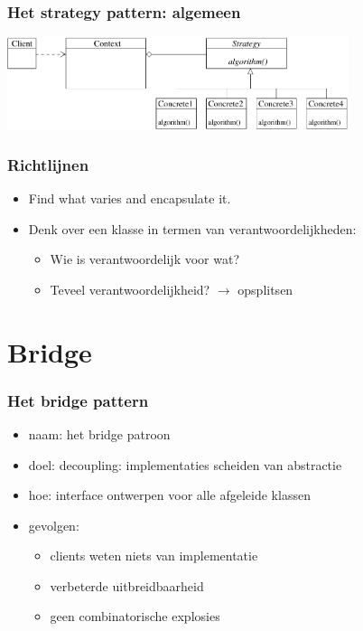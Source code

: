 \documentclass{beamer}
\begin{document}
\begin{frame}
\frametitle{Het strategy pattern: algemeen}
\begin{center}
\includegraphics[width=10cm]{strategy1}
\end{center}
\end{frame}

\begin{frame}
\frametitle{Richtlijnen}
\begin{itemize}
\item Find what varies and encapsulate it.
\item Denk over een klasse in termen van verantwoordelijkheden:
  \begin{itemize}
  \item Wie is verantwoordelijk voor wat?
  \item Teveel verantwoordelijkheid? $\rightarrow$ opsplitsen 
  \end{itemize}
\end{itemize}
\end{frame}

\section{Bridge}
\begin{frame} \frametitle{Het bridge pattern}
  \begin{itemize}
  \item naam: het bridge patroon
  \item doel: decoupling: implementaties scheiden van abstractie
  \item hoe: interface ontwerpen voor alle afgeleide klassen
  \item gevolgen: 
    \begin{itemize}
    \item clients weten niets van implementatie
    \item verbeterde uitbreidbaarheid
    \item geen combinatorische explosies
    \end{itemize}
  \end{itemize}
\end{frame}
\end{document}
